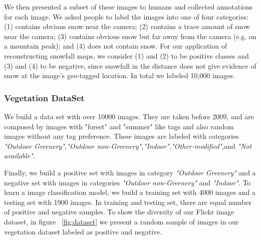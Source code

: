 We then presented a subset of these images to humans and collected
annotations for each image. We asked people to label
the images into one of four categories: (1) contains obvious
snow near the camera; (2) contains a trace amount of snow near
the camera; (3) contains obvious snow but far away from the
camera (e.g. on a mountain peak); and (4) does not contain snow. 
For our application of reconstructing snowfall maps, we consider (1)
and (2) to be positive classes and (3) and (4) to be negative,
since snowfall in the distance does not give evidence of snow
at the image's geo-tagged location. In total we labeled 10,000 images.

\subsubsection{Vegetation DataSet}


We build a data set with over 10000 images. They are taken before 2009, and are composed by images with "forest" and "summer" like tags and also random images without any tag preference. These images are labeled with categories 
\textit{"Outdoor Greenery","Outdoor non-Greenery","Indoor","Other-modified"},and \textit{"Not available"}.

Finally, we build a positive set with images in category \textit{"Outdoor Greenery"} and a negative set 
with images in categories \textit{"Outdoor non-Greenery"} and \textit{"Indoor"}. To learn a image classification model, we build a training set with 4000 images and a testing set with 1900 images. In training and testing set, there are equal number of positive and negative samples.
To show the diversity of our Flickr image dataset, in figure ~\ref{fig:dataset} we present a random sample of images in our vegetation dataset labeled as positive and negative.









